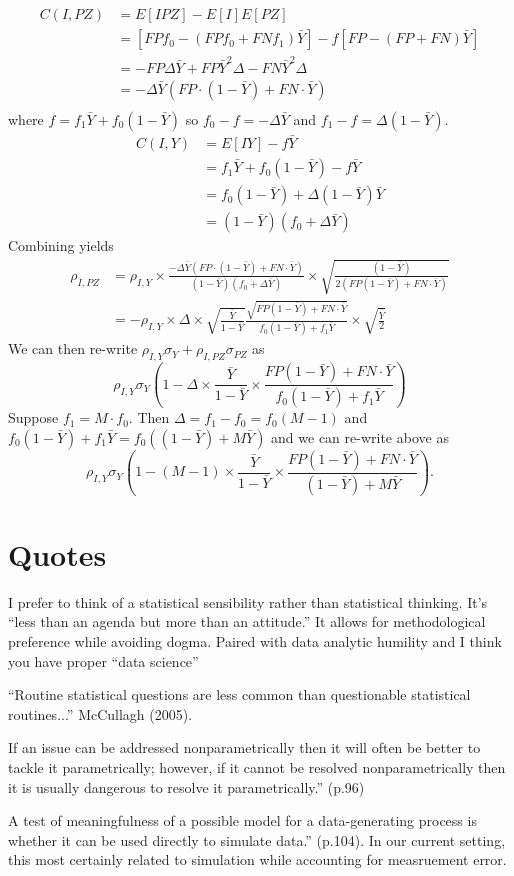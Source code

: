 \documentclass[12pt]{article}
\numberwithin{equation}{section}
\theoremstyle{plain}
\begin{document}
$$
\begin{aligned}
C(I, PZ) &= E[ I P Z ] - E[I] E[PZ] \\
&=  [FP f_0 - (FP f_0 + FN f_1) \bar Y] - f [ FP - (FP+FN) \bar Y ] \\
&=  - FP \Delta \bar Y + FP \bar Y^2 \Delta - FN \bar Y^2 \Delta \\
&=  - \Delta \bar Y (FP \cdot (1-\bar Y) + FN \cdot \bar Y) \\
\end{aligned}
$$
where $f = f_1 \bar Y + f_0 (1-\bar Y)$ so $f_0 - f = -\Delta \bar Y$ and $f_1 - f = \Delta (1-\bar Y)$.
$$
\begin{aligned}
C(I, Y) &= E[ I Y ] - f \bar Y \\
&=  f_1 \bar Y + f_0 (1-\bar Y) - f \bar Y \\
&=  f_0 (1-\bar Y) + \Delta (1-\bar Y) \bar Y \\
&= (1-\bar Y) (f_0 + \Delta \bar Y)
\end{aligned}
$$
Combining yields
$$
\begin{aligned}
\rho_{I,PZ} &= \rho_{I,Y} \times \frac{- \Delta \bar Y (FP \cdot (1-\bar Y) + FN \cdot \bar Y) }{(1-\bar Y) (f_0 + \Delta \bar Y)} \times \sqrt{ \frac{(1-\bar Y)}{2 ( FP (1-\bar Y) + FN \cdot \bar Y)} } \\
&= - \rho_{I, Y} \times \Delta \times \sqrt{\frac{\bar Y}{1-\bar Y}} \frac{\sqrt{FP(1-\bar Y) + FN \cdot \bar Y}}{f_0 (1-\bar Y) + f_1 \bar Y} \times \sqrt{\frac{\bar Y}{2}}
\end{aligned}
$$
We can then re-write $\rho_{I,Y} \sigma_Y + \rho_{I,PZ} \sigma_{PZ}$ as
$$
\rho_{I,Y} \sigma_Y \left( 1 - \Delta \times \frac{\bar Y}{1-\bar Y} \times \frac{FP(1-\bar Y) + FN \cdot \bar Y}{f_0 (1-\bar Y) + f_1 \bar Y} \right)
$$
Suppose $f_1 = M \cdot f_0$.  Then $\Delta = f_1 - f_0 = f_0 (M-1)$ and $f_0 (1-\bar Y) + f_1 \bar Y = f_0 ( (1-\bar Y) + M \bar Y )$ and we can re-write above as
$$
\rho_{I,Y} \sigma_Y \left( 1 - (M-1) \times \frac{\bar Y}{1-\bar Y} \times \frac{FP(1-\bar Y) + FN \cdot \bar Y}{(1-\bar Y) + M \bar Y} \right).
$$

\section{Quotes}

I prefer to think of a statistical sensibility rather than statistical thinking. It’s “less than an agenda but more than an attitude.”  It allows for methodological preference while avoiding dogma. Paired with data analytic humility and I think you have proper “data science”

“Routine statistical questions are less common than questionable statistical routines...” McCullagh (2005).

If an issue can be addressed nonparametrically then it will often be better to tackle it parametrically; however, if it cannot be resolved nonparametrically then it is usually dangerous to resolve it parametrically.” (p.96)

A test of meaningfulness of a possible model for a data-generating process is whether it can be used directly to simulate data.” (p.104).  In our current setting, this most certainly related to simulation while accounting for measruement error.
\end{document}
